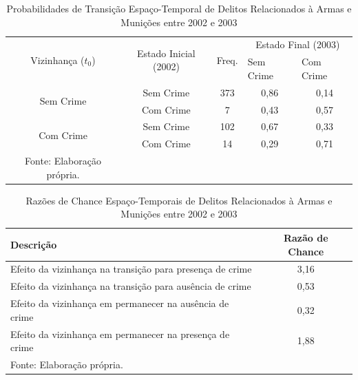 \documentclass[12pt,openright,oneside,a4paper,english,french,spanish]{abntex2}
\numberwithin{table}{section} %
\numberwithin{figure}{section} %
\begin{document}
\begin{subappendices}
\begin{table}[H]
\centering
\caption{Probabilidades de Transição Espaço-Temporal de Delitos Relacionados à Armas e Munições entre 2002 e 2003}
        \begin{tabular}{ccccc}
            \hline
            \multirow{2}{*}{Vizinhança ($t_0$)} & \multirow{2}{*}{Estado Inicial (2002)} & \multirow{2}{*}{Freq.} & \multicolumn{2}{c}{Estado Final (2003)}  \\\cline{4-5} %
                                        & & & \multicolumn{1}{l}{Sem Crime} & \multicolumn{1}{l}{Com Crime} \\\hline
            \multirow{2}{*}{Sem Crime} & {Sem Crime} & 373 &  {0,86} & {0,14} \\
                                       & {Com Crime} & 7 &    {0,43} & {0,57} \\\hline
            \multirow{2}{*}{Com Crime} & {Sem Crime} & 102 &  {0,67} & {0,33} \\
                                       & {Com Crime} & 14 &   {0,29} & {0,71} \\\hline
            \tiny Fonte: Elaboração própria.
        \end{tabular}
    \label{tab:prob_espaco_tempo_rel_arma_2002_2003}
\end{table}


\begin{table}[H]
\centering
\caption{Razões de Chance Espaço-Temporais de Delitos Relacionados à Armas e Munições entre 2002 e 2003}
        \begin{tabular}{lc}
            \hline
            {\textbf{Descrição}} & {\textbf{Razão de Chance}} \\\hline
            {Efeito da vizinhança na transição para presença de crime} & {3,16} \\
            {Efeito da vizinhança na transição para ausência de crime} & {0,53} \\
            {Efeito da vizinhança em permanecer na ausência de crime} & {0,32} \\
            {Efeito da vizinhança em permanecer na presença de crime} & {1,88} \\\hline
            \tiny Fonte: Elaboração própria.
        \end{tabular}
    \label{tab:odds_espaco_tempo_rel_arma_2002_2003}
\end{table}



























\end{subappendices}
\end{document}
